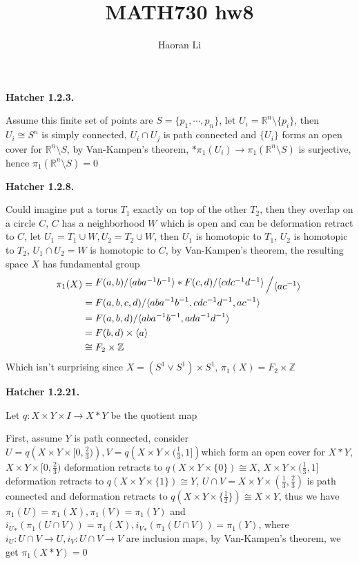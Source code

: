 \documentclass[12pt]{article}
\title{MATH730 hw8}
\author{Haoran Li}
\date{}
\newcommand{\bigslant}[2]{{\raisebox{.2em}{$#1$}\left/\raisebox{-.2em}{$#2$}\right.}}
\begin{document}
\maketitle
\textbf{Hatcher 1.2.3.} \par
Assume this finite set of points are $S=\{p_1,\cdots,p_n\}$, let $U_i=\mathbb{R}^n\setminus\{p_i\}$, then $U_i\cong S^n$ is simply connected, $U_i\cap U_j$ is path connected and $\{U_i\}$ forms an open cover for $\mathbb{R}^n\setminus S$, by Van-Kampen's theorem, $*\pi_1(U_i)\rightarrow \pi_1(\mathbb{R}^n\setminus S)$ is surjective, hence $\pi_1(\mathbb{R}^n\setminus S)=0$ \par
\textbf{Hatcher 1.2.8.} \par
Could imagine put a torus $T_1$ exactly on top of the other $T_2$, then they overlap on a circle $C$, $C$ has a neighborhood $W$ which is open and can be deformation retract to $C$, let $U_1=T_1\cup W, U_2=T_2\cup W$, then $U_1$ is homotopic to $T_1$, $U_2$ is homotopic to $T_2$, $U_1\cap U_2=W$ is homotopic to $C$, by Van-Kampen's theorem, the resulting space $X$ has fundamental group
\[
\begin{aligned}
\pi_1(X)
&=\bigslant{F(a,b)/\langle aba^{-1}b^{-1}\rangle *F(c,d)/\langle cdc^{-1}d^{-1}\rangle}{\langle ac^{-1}\rangle} \\
&=F(a,b,c,d)/\langle aba^{-1}b^{-1},cdc^{-1}d^{-1},ac^{-1}\rangle \\
&=F(a,b,d)/\langle aba^{-1}b^{-1},ada^{-1}d^{-1}\rangle \\
&=F(b,d)\times \langle a\rangle \\
&\cong F_2\times \mathbb{Z}
\end{aligned}
\]
Which isn't surprising since $X=(S^1\vee S^1)\times S^1$, $\pi_1(X)=F_2\times \mathbb{Z}$ \par
\textbf{Hatcher 1.2.21.} \par
Let $q:X\times Y\times I\rightarrow X*Y$ be the quotient map \par
First, assume $Y$ is path connected, consider $U=q\left(X\times Y\times [0,\frac{2}{3})\right), V=q\left(X\times Y\times (\frac{1}{3},1]\right)$which form an open cover for $X*Y$, $X\times Y\times [0,\frac{2}{3})$ deformation retracts to $q(X\times Y\times \{0\})\cong X$, $X\times Y\times (\frac{1}{3},1]$ deformation retracts to $q(X\times Y\times \{1\})\cong Y$, $U\cap V=X\times Y\times (\frac{1}{3},\frac{2}{3})$ is path connected and deformation retracts to $q(X\times Y\times \{\frac{1}{2}\})\cong X\times Y$, thus we have $\pi_1(U)=\pi_1(X),\pi_1(V)=\pi_1(Y)$ and ${i_U}_*(\pi_1(U\cap V))=\pi_1(X), {i_V}_*(\pi_1(U\cap V))=\pi_1(Y)$, where $i_U:U\cap V\rightarrow U, i_V:U\cap V\rightarrow V$ are inclusion maps, by Van-Kampen's theorem, we get $\pi_1(X*Y)=0$ \par
\end{document}

